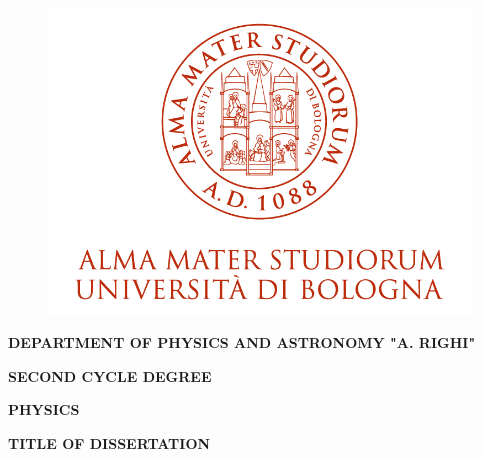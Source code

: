 \begin{titlepage}
        \thispagestyle{fancy}
    \begin{figure}[H]
        \vspace{-1.5cm} %
        \centering
        \includegraphics[scale=1.05]{logo_unibo.png}
    \end{figure}
    
    \vspace{3mm}
    
    \begin{center}
        \bf {DEPARTMENT OF PHYSICS AND ASTRONOMY "A. RIGHI"}
    \end{center}
    
    \vspace{3mm}
    
    \begin{center}
        \bf \large{SECOND CYCLE DEGREE}
    \end{center}
    
    \vspace{0.7mm}
    
    \begin{center}
        \bf \large{PHYSICS}
    \end{center}
    
    \vspace{15mm}
    
    \begin{center}
        {\huge{\bf TITLE OF DISSERTATION}}
    \end{center}
    

\end{titlepage}
